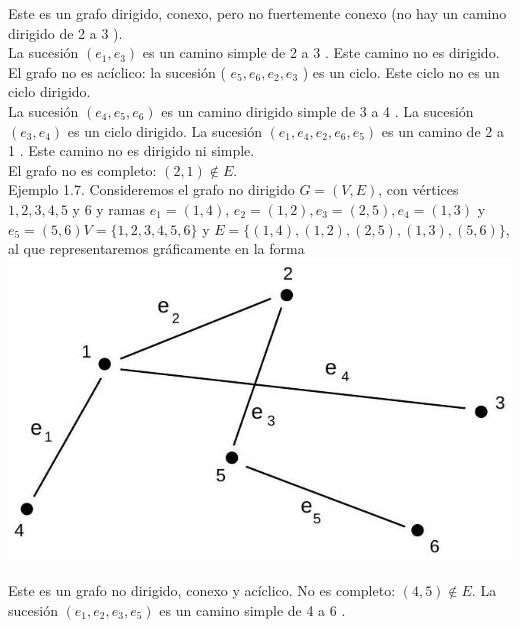 \documentclass[10pt]{article}
\begin{document}
Este es un grafo dirigido, conexo, pero no fuertemente conexo (no hay un camino dirigido de 2 a 3 ).\\
La sucesión $\left(e_{1}, e_{3}\right)$ es un camino simple de 2 a 3 . Este camino no es dirigido. El grafo no es acíclico: la sucesión ( $e_{5}, e_{6}, e_{2}, e_{3}$ ) es un ciclo. Este ciclo no es un ciclo dirigido.\\
La sucesión $\left(e_{4}, e_{5}, e_{6}\right)$ es un camino dirigido simple de 3 a 4 . La sucesión $\left(e_{3}, e_{4}\right)$ es un ciclo dirigido. La sucesión $\left(e_{1}, e_{4}, e_{2}, e_{6}, e_{5}\right)$ es un camino de 2 a 1 . Este camino no es dirigido ni simple.\\
El grafo no es completo: $(2,1) \notin E$.\\
Ejemplo 1.7. Consideremos el grafo no dirigido $G=(V, E)$, con vértices $1,2,3,4,5$ y 6 y ramas $e_{1}=(1,4)$, $e_{2}=(1,2), e_{3}=(2,5), e_{4}=(1,3)$ y $e_{5}=(5,6) V=\{1,2,3,4,5,6\}$ y $E=\{(1,4),(1,2),(2,5),(1,3),(5,6)\}$, al que representaremos gráficamente en la forma\\
\includegraphics[max width=\textwidth, center]{2025_09_05_93c7c1835f249f70c0eeg-02(3)}

Este es un grafo no dirigido, conexo y acíclico. No es completo: $(4,5) \notin E$. La sucesión $\left(e_{1}, e_{2}, e_{3}, e_{5}\right)$ es un camino simple de 4 a 6 .
\end{document}
